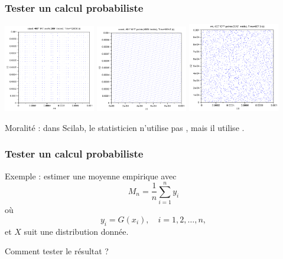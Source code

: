 \documentclass{beamer}
\begin{document}
\begin{frame}[containsverbatim]
\frametitle{Tester un calcul probabiliste}

\begin{center}
\includegraphics[width=0.3\textwidth]{crand}
\includegraphics[width=0.3\textwidth]{grand-urand}
\includegraphics[width=0.3\textwidth]{grand-mt}
\end{center}

Moralité : dans Scilab, le statisticien n'utilise pas , mais il utilise 
.

\end{frame}
\begin{frame}[containsverbatim]
\frametitle{Tester un calcul probabiliste}

Exemple : estimer une moyenne empirique avec 
$$
M_n = \frac{1}{n} \sum_{i=1}^n y_i
$$
où 
$$
y_i = G(x_i), \quad i=1,2,\ldots,n,
$$
et $X$ suit une distribution donnée.

Comment tester le résultat ?

\end{frame}
\end{document}
